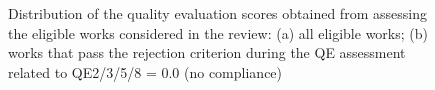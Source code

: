 \documentclass[10pt,a4paper,notitlepage,twocolumn,oneside]{article}
\begin{document}
\begin{figure}[h]
  \centering
  \linebreak
  \caption{Distribution of the quality evaluation scores obtained from assessing the eligible works considered in the review: (a) all eligible works; (b) works that pass the rejection criterion during the QE assessment related to QE2/3/5/8 = 0.0 (no compliance)}
  \label{fig:methodology:qe}
\end{figure}
\end{document}
